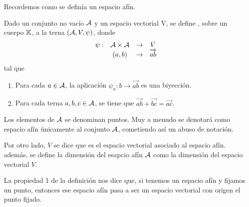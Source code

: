 Recordemos como se definía un espacio afín.
\begin{defi}\label{C9_def_espacio_afin}
	Dado un conjunto no vacío $\mathcal{A}$ y un espacio vectorial V, se define , sobre un cuerpo $\mathbb{K}$, a la terna $(\mathcal{A},V,\psi)$, donde
	\begin{equation*}
		\begin{array}{cccc}
			\psi: & \mathcal{A} \times \mathcal{A} & \rightarrow &V\\
			& (a,b) & \rightarrow & \overrightarrow{ab}
		\end{array}
	\end{equation*}
	tal que 
	\begin{enumerate}
		\item Para cada $a\in\mathcal{A}$, la aplicación $\psi_a: b\rightarrow \overrightarrow{ab}$ es una biyección.
		
		\item Para cada terna $a,b,c\in\mathcal{A}$, se tiene que $\overrightarrow{ab}+\overrightarrow{bc}=\overrightarrow{ac}$.
	\end{enumerate}
\end{defi}
Los elementos de $\mathcal{A}$ se denominan puntos. Muy a menudo se denotará como espacio afín únicamente al conjunto $\mathcal{A}$, cometiendo así un abuso de notación.

Por otro lado, $V$ se dice que es el espacio vectorial asociado al espacio afín. además, se define la dimensión del esapcio afín $\mathcal{A}$ como la dimensión del espacio vectorial $V$.

La propiedad 1 de la definición nos dice que, si tenemos un espacio afín y fijamos un punto, entonces ese espacio afín pasa a ser un espacio vectorial con origen el punto fijado.

